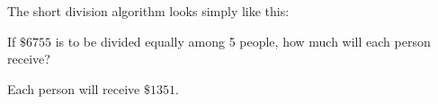 The short division algorithm looks simply like this:



\begin{examples}
    \begin{questions}
        \Question[1] \mbox{}
        \begin{solutionorbox}[1in]
        \end{solutionorbox}
        \Question[1] \mbox{}
        \begin{solutionorbox}[1in]
        \end{solutionorbox}
        \Question[2] If \(\$ 6755\) is to be divided equally among 5 people, how much will each person receive?
        \begin{solutionorbox}[1in]
            Each person will receive \(\$ 1351\).
        \end{solutionorbox}
    \end{questions}
\end{examples}

